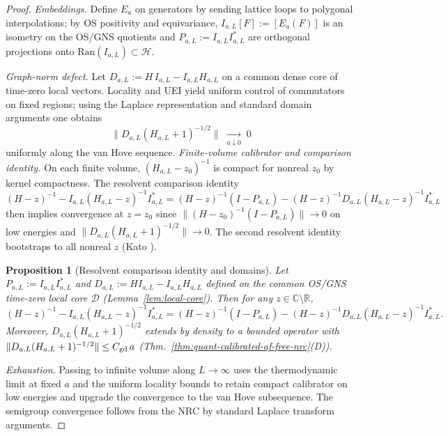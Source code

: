 \documentclass[11pt]{amsart}
\theoremstyle{plain}
\newtheorem{proposition}[theorem]{Proposition}
\theoremstyle{definition}
\theoremstyle{remark}
\begin{document}
\begin{proof}
\emph{Embeddings.} Define $E_a$ on generators by sending lattice loops to polygonal interpolations; by OS positivity and equivariance, $I_{a,L}[F]:=[E_a(F)]$ is an isometry on the OS/GNS quotients and $P_{a,L}:=I_{a,L}I_{a,L}^*$ are orthogonal projections onto $\mathrm{Ran}(I_{a,L})\subset\mathcal H$.

\emph{Graph-norm defect.} Let $D_{a,L}:=H\,I_{a,L}-I_{a,L} H_{a,L}$ on a common dense core of time-zero local vectors. Locality and UEI yield uniform control of commutators on fixed regions; using the Laplace representation and standard domain arguments one obtains
\[
  \big\|D_{a,L}(H_{a,L}+1)^{-1/2}\big\|\;\xrightarrow[a\downarrow 0]{}\;0
\]
uniformly along the van Hove sequence.
\emph{Finite-volume calibrator and comparison identity.} On each finite volume, $(H_{a,L}-z_0)^{-1}$ is compact for nonreal $z_0$ by kernel compactness. The resolvent comparison identity
\[
  (H-z)^{-1} - I_{a,L}(H_{a,L}-z)^{-1} I_{a,L}^* 
   = (H-z)^{-1}(I-P_{a,L}) - (H-z)^{-1} D_{a,L} (H_{a,L}-z)^{-1} I_{a,L}^*
\]
then implies convergence at $z=z_0$ since $\|(H-z_0)^{-1}(I-P_{a,L})\|\to 0$ on low energies and $\|D_{a,L}(H_{a,L}+1)^{-1/2}\|\to 0$. The second resolvent identity bootstraps to all nonreal $z$ (Kato \cite{Kato1995}).

\begin{proposition}[Resolvent comparison identity and domains]\label{prop:resolvent-comparison}
Let $P_{a,L}:=I_{a,L}I_{a,L}^*$ and $D_{a,L}:= H I_{a,L} - I_{a,L} H_{a,L}$ defined on the common OS/GNS time-zero local core $\mathcal D$ (Lemma~\ref{lem:local-core}). Then for any $z\in\mathbb C\setminus\mathbb R$,
\[
  (H-z)^{-1} - I_{a,L}(H_{a,L}-z)^{-1} I_{a,L}^* 
   = (H-z)^{-1}(I-P_{a,L}) - (H-z)^{-1} D_{a,L} (H_{a,L}-z)^{-1} I_{a,L}^*.
\]
Moreover, $D_{a,L}(H_{a,L}+1)^{-1/2}$ extends by density to a bounded operator with $\|D_{a,L}(H_{a,L}+1)^{-1/2}\|\le C_{\rm gd}\,a$ (Thm.~\ref{thm:quant-calibrated-af-free-nrc}(D)).
\end{proposition}

\emph{Exhaustion.} Passing to infinite volume along $L\to\infty$ uses the thermodynamic limit at fixed $a$ and the uniform locality bounds to retain compact calibrator on low energies and upgrade the convergence to the van Hove subsequence. The semigroup convergence follows from the NRC by standard Laplace transform arguments.
\end{proof}
\end{document}
